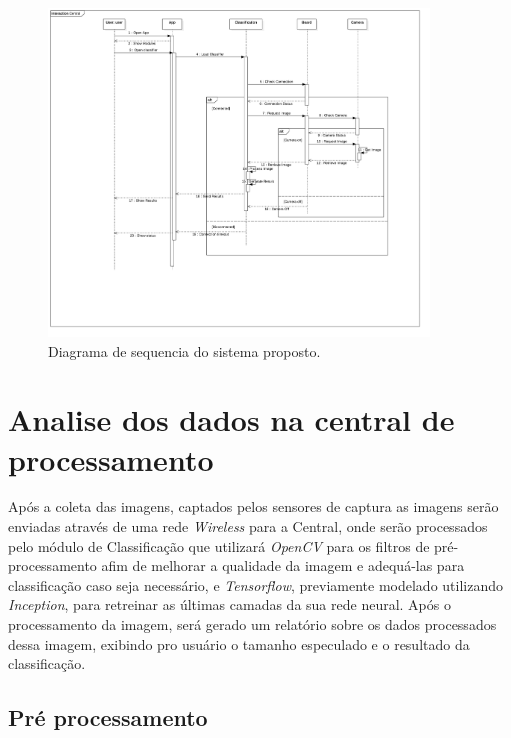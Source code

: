 \begin{figure}[ht]
	\caption{\label{fig:seqkraken}  Diagrama de sequencia do sistema proposto.}
	 \begin{center}
		\includegraphics[width = 0.9\textwidth]			{resources/sequencekraken}
    \end{center}
\end{figure}


\section{Analise dos dados na central de processamento}
Após a coleta das imagens, captados pelos sensores de captura as imagens serão enviadas através de uma rede \textit{Wireless} para a Central, onde serão processados pelo módulo de Classificação que utilizará \textit{OpenCV} para os filtros de pré-processamento afim de melhorar a qualidade da imagem e adequá-las para classificação caso seja necessário, e \textit{Tensorflow}, previamente modelado utilizando \textit{Inception}, para retreinar as últimas camadas da sua rede neural. 
Após o processamento da imagem, será gerado um relatório sobre os dados processados dessa imagem, exibindo pro usuário o tamanho especulado e o resultado da classificação.

\subsection{Pré processamento}
\subsubsection{}

